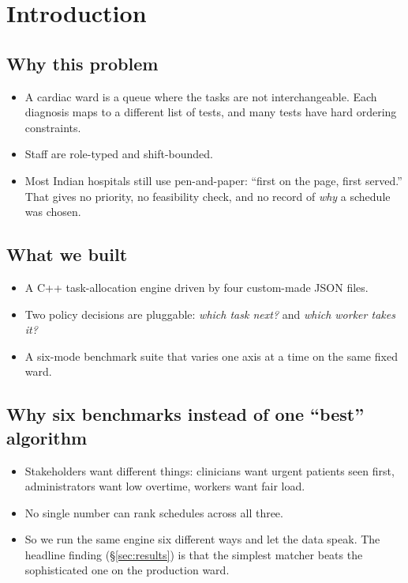 \section{Introduction}
\label{sec:intro}

\subsection{Why this problem}

\begin{itemize}
  \item A cardiac ward is a queue where the tasks are not
        interchangeable. Each diagnosis maps to a different list
        of tests, and many tests have hard ordering constraints.
  \item Staff are role-typed and shift-bounded.
  \item Most Indian hospitals still use pen-and-paper:
        ``first on the page, first served.'' That gives no
        priority, no feasibility check, and no record of
        \emph{why} a schedule was chosen.
\end{itemize}

\subsection{What we built}

\begin{itemize}
  \item A C++ task-allocation engine driven by four custom-made
        JSON files.
  \item Two policy decisions are pluggable:
        \emph{which task next?} and \emph{which worker takes it?}
  \item A six-mode benchmark suite that varies one axis at a time
        on the same fixed ward.
\end{itemize}

\subsection{Why six benchmarks instead of one ``best'' algorithm}

\begin{itemize}
  \item Stakeholders want different things: clinicians want
        urgent patients seen first, administrators want low
        overtime, workers want fair load.
  \item No single number can rank schedules across all three.
  \item So we run the same engine six different ways and let the
        data speak. The headline finding (\S\ref{sec:results}) is
        that the simplest matcher beats the sophisticated one on
        the production ward.
\end{itemize}

